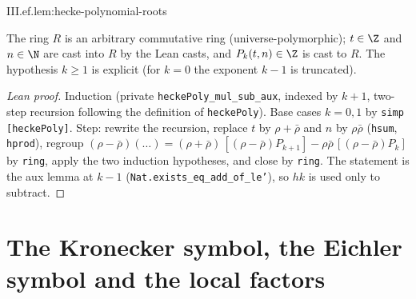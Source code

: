\begin{lemma}
\end{lemma}
\begin{tfformal}{III.ef.lem:hecke-polynomial-roots}
\begin{tffidelity}
The ring $R$ is an arbitrary commutative ring (universe-polymorphic); $t\in\Z$ and $n\in\N$ are cast into $R$ by the Lean casts, and $P_k(t,n)\in\Z$ is cast to $R$. The hypothesis $k\ge1$ is explicit (for $k=0$ the exponent $k-1$ is truncated).
\end{tffidelity}
\end{tfformal}
\begin{proof}[Lean proof]
Induction (private \texttt{heckePoly\_mul\_sub\_aux}, indexed by $k+1$, two-step recursion following the definition of \texttt{heckePoly}). Base cases $k=0,1$ by \texttt{simp [heckePoly]}. Step: rewrite the recursion, replace $t$ by $\rho+\bar\rho$ and $n$ by $\rho\bar\rho$ (\texttt{hsum}, \texttt{hprod}), regroup $(\rho-\bar\rho)(\ldots)=(\rho+\bar\rho)\,[(\rho-\bar\rho)P_{k+1}]-\rho\bar\rho\,[(\rho-\bar\rho)P_k]$ by \texttt{ring}, apply the two induction hypotheses, and close by \texttt{ring}. The statement is the aux lemma at $k-1$ (\texttt{Nat.exists\_eq\_add\_of\_le'}), so $hk$ is used only to subtract.
\end{proof}

\section{The Kronecker symbol, the Eichler symbol and the local factors}\label{sec:ef-local}

